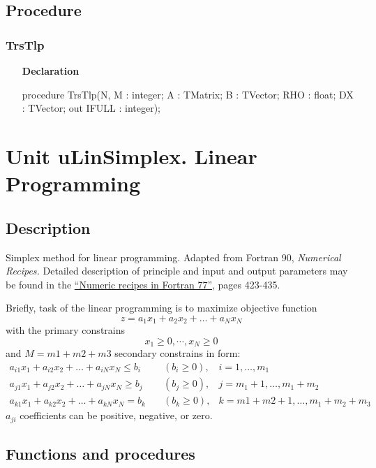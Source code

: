 \documentclass[12pt,a4paper,oneside]{report}
\newcommand{\declarationitem}[1]{\textbf{#1}}
\begin{document}
\subsection{Procedure}
\subsubsection{TrsTlp}
\label{utrstlp:trstlp}
\begin{itemize}
	\item[\declarationitem{Declaration}\hfill]
	\begin{flushleft}
procedure TrsTlp(N, M : integer; A : TMatrix; B : TVector; RHO : float; DX : TVector; out IFULL : integer);
	\end{flushleft}
\end{itemize}

\section[Unit uLinSimplex]{Unit uLinSimplex. Linear Programming}
\subsection{Description}
Simplex method for linear programming.  
Adapted from Fortran 90, \textit{Numerical Recipes.}
Detailed description of principle and input and output parameters may be found in the 
\href{https://websites.pmc.ucsc.edu/~fnimmo/eart290c_17/NumericalRecipesinF77.pdf}{``Numeric recipes in Fortran 77''}, pages 423-435.

Briefly, task of the linear programming is to maximize objective function
\begin{equation}\label{eq:linprogobjective}
z=a_1x_1+a_2x_2+\dots+a_Nx_N
\end{equation}
with the primary constrains $$x_1 \geq 0,\cdots,x_N \geq 0$$
and $M = m1+m2+m3$ secondary constrains in form:
\begin{align}
a_{i1}x_1+a_{i2}x_2+\dots+a_{iN}x_N \leq b_i & \quad (b_i \geq 0), &i=1,\dots,m_1 \label{eq:linprogm1}\\
a_{j1}x_1+a_{j2}x_2+\dots+a_{jN}x_N \geq b_j & \quad (b_j \geq 0), &j=m_1+1,\dots,m_1+m_2 \label{eq:linprogm2}\\
a_{k1}x_1+a_{k2}x_2+\dots+a_{kN}x_N = b_k & \quad (b_k \geq 0), &k=m1+m2+1,\dots,m_1+m_2+m_3 \label{eq:linprogm3}
\end{align}
$a_{ji}$ coefficients can be positive, negative, or zero.
\subsection{Functions and procedures}
\end{document}
